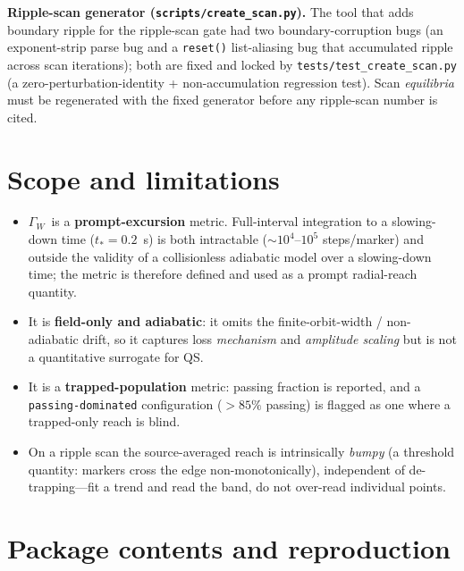 \documentclass[11pt]{article}
\newcommand{\code}[1]{\texttt{#1}}
\newcommand{\GW}{\ensuremath{\Gamma_W}}
\begin{document}
\textbf{Ripple-scan generator (\code{scripts/create\_scan.py}).} The tool that adds boundary
ripple for the ripple-scan gate had two boundary-corruption bugs (an exponent-strip parse bug and
a \code{reset()} list-aliasing bug that accumulated ripple across scan iterations); both are fixed
and locked by \code{tests/test\_create\_scan.py} (a zero-perturbation-identity + non-accumulation
regression test). Scan \emph{equilibria} must be regenerated with the fixed generator before any
ripple-scan number is cited.

\section{Scope and limitations}
\label{sec:scope}

\begin{itemize}[nosep]
  \item \GW\ is a \textbf{prompt-excursion} metric. Full-interval integration to a slowing-down
        time ($t_\ast=0.2$~s) is both intractable ($\sim10^4$--$10^5$ steps/marker) and outside
        the validity of a collisionless adiabatic model over a slowing-down time; the metric is
        therefore defined and used as a prompt radial-reach quantity.
  \item It is \textbf{field-only and adiabatic}: it omits the finite-orbit-width / non-adiabatic
        drift, so it captures loss \emph{mechanism} and \emph{amplitude scaling} but is not a
        quantitative surrogate for QS.
  \item It is a \textbf{trapped-population} metric: passing fraction is reported, and a
        \code{passing-dominated} configuration ($>85\%$ passing) is flagged as one where a
        trapped-only reach is blind.
  \item On a ripple scan the source-averaged reach is intrinsically \emph{bumpy} (a threshold
        quantity: markers cross the edge non-monotonically), independent of de-trapping---fit a
        trend and read the band, do not over-read individual points.
\end{itemize}

\section{Package contents and reproduction}
\end{document}
